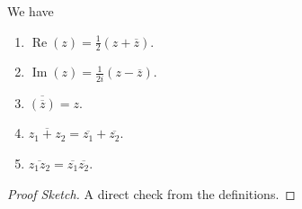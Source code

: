 \documentclass[a4]{scrartcl}
\begin{document}
\begin{proposition}
	We have
	\begin{enumerate}[label=(\roman*)]
		\item $\operatorname{Re}(z) = \frac{1}{2}(z + \overline{z})$.
		\item $\operatorname{Im}(z) = \frac{1}{2i}(z - \overline{z})$.
		\item $\overline{(\overline{z})} = z$.
		\item $\overline{z_1 + z_2} = \overline{z_1} + \overline{z_2}$.
		\item $\overline{z_1 z_2} = \overline{z_1} \overline{z_2}$.
	\end{enumerate}
\end{proposition}
\begin{proof}[Proof Sketch]
	A direct check from the definitions.
\end{proof}
\end{document}
